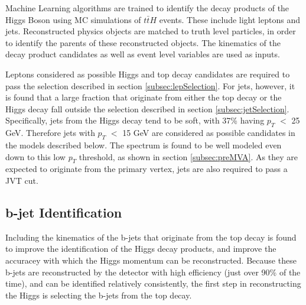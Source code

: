 Machine Learning algorithms are trained to identify the decay products of the Higgs Boson using MC simulations of $t\bar{t}H$ events. These include light leptons and jets. Reconstructed physics objects are matched to truth level particles, in order to identify the parents of these reconstructed objects. The kinematics of the decay product candidates as well as event level variables are used as inputs. 


Leptons considered as possible Higgs and top decay candidates are required to pass the selection described in section \ref{subsec:lepSelection}. For jets, however, it is found that a large fraction that originate from either the top decay or the Higgs decay fall outside the selection described in section \ref{subsec:jetSelection}. Specifically, jets from the Higgs decay tend to be soft, with 37\% having $p_T$ $<$ 25 GeV. Therefore jets with $p_T$ $<$ 15 GeV are considered as possible candidates in the models described below. The spectrum is found to be well modeled even down to this low $p_T$ threshold, as shown in section \ref{subsec:preMVA}. As they are expected to originate from the primary vertex, jets are also required to pass a JVT cut.

\subsection{b-jet Identification}
\label{sec:bjetID}

Including the kinematics of the b-jets that originate from the top decay is found to improve the identification of the Higgs decay products, and improve the accuracey with which the Higgs momentum can be reconstructed. Because these b-jets are reconstructed by the detector with high efficiency (just over 90\% of the time), and can be identified relatively consistently, the first step in reconstructing the Higgs is selecting the b-jets from the top decay.

